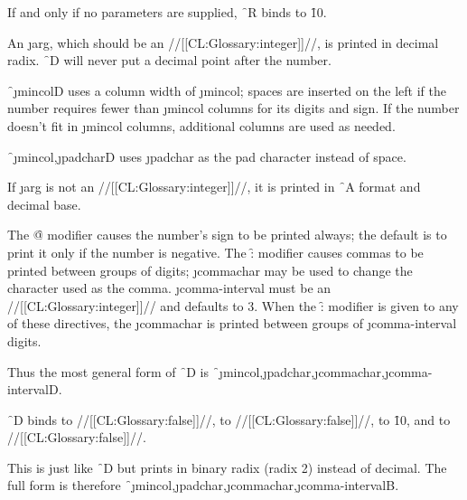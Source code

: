 If and only if no parameters are supplied,
\f{~R} binds  to \f{10}.


\endsubsubsection%




An \j{arg}, which should be an //[[CL:Glossary:integer]]//, 
is printed in decimal radix.
\f{~D} will never put a decimal point after the number.


\f{~\j{mincol}D} uses 
a column width of \j{mincol}; spaces are inserted on
the left if the number requires fewer than \j{mincol} columns for its digits
and sign.  If the number doesn't fit in \j{mincol} columns, additional columns
are used as needed.


\f{~\j{mincol},\j{padchar}D} uses \j{padchar} as the pad character
instead of space.


If \j{arg} is not an //[[CL:Glossary:integer]]//, it is printed in \f{~A} format and decimal base.


The \f{@} modifier causes the number's sign to be printed always; the default
is to print it only if the number is negative.
The \f{:} modifier causes commas to be printed between groups of digits;
\j{commachar} may be used to change the character used as the comma.
\j{comma-interval} 
must be an //[[CL:Glossary:integer]]// and defaults to 3.  When the \f{:} 
modifier is given to any of
these directives, the \j{commachar} 
is printed between groups of \j{comma-interval}
digits.


Thus the most general form of \f{~D} is
\f{~\j{mincol},\j{padchar},\j{commachar},\j{comma-interval}D}.

\f{~D} binds
      to //[[CL:Glossary:false]]//,
      to //[[CL:Glossary:false]]//,
      to \f{10},
 and  to //[[CL:Glossary:false]]//.



\endsubsubsection%




This is just like \f{~D} but prints in binary radix (radix 2)
instead of decimal.  The full form is therefore
\f{~\j{mincol},\j{padchar},\j{commachar},\j{comma-interval}B}.


